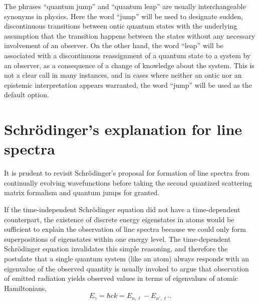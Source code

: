 \documentclass[final,3p,12pt]{elsarticle3}
\begin{document}
The phrases ``quantum jump'' and ``quantum leap'' are usually interchangeable
synonyms in physics. Here the word ``jump'' will be used to designate sudden,
discontinuous transitions between ontic quantum states with the underlying 
assumption that the transition happens between the states without any necessary 
involvement of an observer. On the other hand, the word ``leap'' will be 
associated with a discontinuous reassignment of a quantum state to a system 
by an observer, as a consequence of a change of knowledge about the system.
This is not a clear call in many instances, and in cases where neither an 
ontic nor an epistemic interpretation appears warranted, the word ``jump'' 
will be used as the default option.

\section{Schr\"odinger's explanation for line spectra}
\label{sec:erwin}

It is prudent to revisit Schr\"odinger's proposal for formation of line 
spectra from continually evolving wavefunctions before taking the second 
quantized scattering matrix formalism and quantum jumps for granted.

If the time-independent Schr\"odinger equation did not have a 
time-dependent counterpart, the existence of discrete energy eigenstates 
in atoms would be sufficient to explain the observation of line spectra 
because we could only form superpositions of eigenstates within one energy 
level. The time-dependent Schr\"odinger equation invalidates this simple 
reasoning, and therefore the postulate that a single quantum system (like 
an atom) always responds with an eigenvalue of the observed 
quantity \cite{vonNeumann} is usually invoked to argue that observation of
emitted radiation yields observed values in terms of eigenvalues of atomic
Hamiltonians,
\begin{equation}\label{eq:jump1}
E_\gamma=\hbar ck=E_{n,\ell}-E_{n',\ell'}.
\end{equation}
\end{document}
